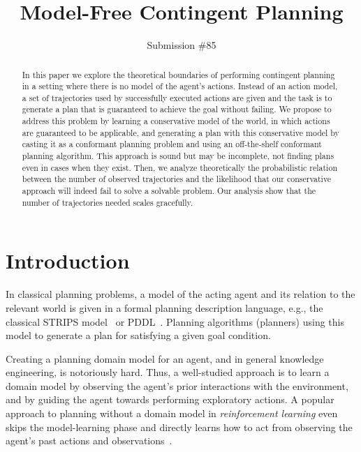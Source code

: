 \documentclass[letterpaper]{article}
\newcommand{\roni}[1]{[[Roni:#1]]}
\begin{document}
\title{Model-Free Contingent Planning}

\author{Submission \#85}

\maketitle

\begin{abstract}%
In this paper we explore the theoretical boundaries of 
performing contingent planning in a setting where 
there is no model of the agent's actions. 
Instead of an action model, a set of trajectories used by successfully executed actions are given and the task is to generate a plan that is guaranteed
to achieve the goal without failing. 
We propose to address this problem by learning a conservative model of the world, in which actions are guaranteed to be applicable, and generating a plan with this conservative model by casting it as a conformant planning problem and using an off-the-shelf conformant planning algorithm. This approach is sound but may be incomplete, not finding plans even in cases when they exist. 
Then, we analyze theoretically the probabilistic relation between the number of observed trajectories and the likelihood that our conservative approach will indeed fail to solve a solvable problem. Our analysis show that the number of trajectories needed scales gracefully. 
\end{abstract}


\section{Introduction}
In classical planning problems, a model of the acting agent and its relation to the relevant world is given in a formal planning description language, e.g., the classical STRIPS model~\cite{fikes1971strips} or PDDL~\cite{mcdermott1998pddl}. Planning algorithms (planners) using this model to generate a plan for satisfying a given goal condition. 

Creating a planning domain model for an agent, and in general knowledge engineering, is notoriously hard. %
Thus, a well-studied approach is to learn a domain model by observing the agent's prior interactions with the environment, and by guiding the agent towards performing exploratory actions. A popular approach to planning without a domain model in {\em reinforcement learning} even skips the model-learning phase and directly learns how to act from observing the agent's past actions and observations~\cite[e.g.]{kearns2002}.  
\end{document}
